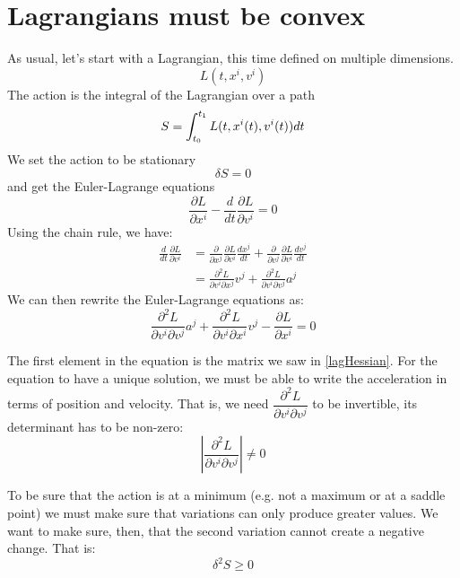 \documentclass[aps,pra,10pt,floatfix,nofootinbib]{revtex4-1}
\theoremstyle{definition}
\begin{document}
\section{Lagrangians must be convex}

As usual, let's start with a Lagrangian, this time defined on multiple dimensions.
\begin{equation}
L(t, x^i, v^i)
\end{equation}
The action is the integral of the Lagrangian over a path
\begin{equation}
S = \int_{t_0}^{t_1} L(t, x^i(t), v^i(t)) dt \\
\end{equation}
We set the action to be stationary
\begin{equation}
\delta S = 0
\end{equation}
and get the Euler-Lagrange equations
\begin{equation}
\label{EulerLagrange}
\frac{\partial L}{\partial x^i} - \frac{d}{dt} \frac{\partial L}{\partial v^i} = 0
\end{equation}
Using the chain rule, we have:
\begin{align*}
\frac{d}{dt} \frac{\partial L}{\partial v^i} &= \frac{\partial}{\partial x^j} \frac{\partial L}{\partial v^i} \frac{dx^j}{dt} + \frac{\partial}{\partial v^j}  \frac{\partial L}{\partial v^i} \frac{dv^j}{dt} \\
&= \frac{\partial^2 L}{\partial v^i \partial x^j} v^j + \frac{\partial^2 L}{\partial v^i \partial v^j} a^j
\end{align*}
We can then rewrite the Euler-Lagrange equations as:
\begin{equation}
\label{EulerLagrangeMod}
\frac{\partial^2 L}{\partial v^i \partial v^j} a^j + \frac{\partial^2 L}{\partial v^i \partial x^i} v^j - \frac{\partial L}{\partial x^i}=0
\end{equation}

The first element in the equation is the matrix we saw in \eqref{lagHessian}. For the equation to have a unique solution, we must be able to write the acceleration in terms of position and velocity. That is, we need $\dfrac{\partial^2 L}{\partial v^i \partial v^j}$ to be invertible, its determinant has to be non-zero:
\begin{equation}
\label{lagHessianNonSingular}
\left|\frac{\partial^2 L}{\partial v^i \partial v^j}\right| \neq 0
\end{equation}

To be sure that the action is at a minimum (e.g. not a maximum or at a saddle point) we must make sure that variations can only produce greater values. We want to make sure, then, that the second variation cannot create a negative change. That is:
\begin{equation}
\delta^2 S \geq 0
\end{equation}
\end{document}
